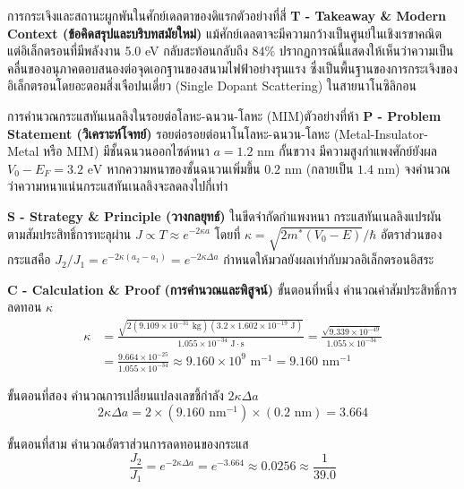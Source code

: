 \begin{psctbox}{การกระเจิงและสถานะผูกพันในศักย์เดลตาของดิแรก}{ตัวอย่างที่สี่}
\vspace{6pt}
\noindent\textbf{T - Takeaway \& Modern Context (ข้อคิดสรุปและบริบทสมัยใหม่)} แม้ศักย์เดลตาจะมีความกว้างเป็นศูนย์ในเชิงเรขาคณิต แต่อิเล็กตรอนที่มีพลังงาน 5.0 eV กลับสะท้อนกลับถึง $84\%$ ปรากฏการณ์นี้แสดงให้เห็นว่าความเป็นคลื่นของอนุภาคตอบสนองต่อจุดเอกฐานของสนามไฟฟ้าอย่างรุนแรง ซึ่งเป็นพื้นฐานของการกระเจิงของอิเล็กตรอนโดยอะตอมสิ่งเจือปนเดี่ยว (Single Dopant Scattering) ในสายนาโนซิลิกอน
\end{psctbox}

\begin{psctbox}{การคำนวณกระแสทันเนลลิงในรอยต่อโลหะ-ฉนวน-โลหะ (MIM)}{ตัวอย่างที่ห้า}
\noindent\textbf{P - Problem Statement (วิเคราะห์โจทย์)} รอยต่อรอยต่อนาโนโลหะ-ฉนวน-โลหะ (Metal-Insulator-Metal หรือ MIM) มีชั้นฉนวนออกไซด์หนา $a = 1.2\text{ nm}$ กั้นขวาง มีความสูงกำแพงศักย์ยังผล $V_0 - E_F = 3.2\text{ eV}$ หากความหนาของชั้นฉนวนเพิ่มขึ้น $0.2\text{ nm}$ (กลายเป็น $1.4\text{ nm}$) จงคำนวณว่าความหนาแน่นกระแสทันเนลลิงจะลดลงไปกี่เท่า

\vspace{6pt}
\noindent\textbf{S - Strategy \& Principle (วางกลยุทธ์)} ในขีดจำกัดกำแพงหนา กระแสทันเนลลิงแปรผันตามสัมประสิทธิ์การทะลุผ่าน $J \propto T \approx e^{-2\kappa a}$ โดยที่ $\kappa = \sqrt{2m^*(V_0 - E)}/\hbar$ อัตราส่วนของกระแสคือ $J_2/J_1 = e^{-2\kappa(a_2 - a_1)} = e^{-2\kappa \Delta a}$ กำหนดให้มวลยังผลเท่ากับมวลอิเล็กตรอนอิสระ

\vspace{6pt}
\noindent\textbf{C - Calculation \& Proof (การคำนวณและพิสูจน์)}
ขั้นตอนที่หนึ่ง คำนวณค่าสัมประสิทธิ์การลดทอน $\kappa$
\begin{align}
\kappa &= \frac{\sqrt{2(9.109 \times 10^{-31}\text{ kg})(3.2 \times 1.602 \times 10^{-19}\text{ J})}}{1.055 \times 10^{-34}\text{ J}\cdot\text{s}} = \frac{\sqrt{9.339 \times 10^{-49}}}{1.055 \times 10^{-34}} \\
&= \frac{9.664 \times 10^{-25}}{1.055 \times 10^{-34}} \approx 9.160 \times 10^9\text{ m}^{-1} = 9.160\text{ nm}^{-1}
\end{align}

ขั้นตอนที่สอง คำนวณการเปลี่ยนแปลงเลขชี้กำลัง $2\kappa \Delta a$
\begin{equation}
2\kappa \Delta a = 2 \times (9.160\text{ nm}^{-1}) \times (0.2\text{ nm}) = 3.664
\end{equation}

ขั้นตอนที่สาม คำนวณอัตราส่วนการลดทอนของกระแส
\begin{equation}
\frac{J_2}{J_1} = e^{-2\kappa \Delta a} = e^{-3.664} \approx 0.0256 \approx \frac{1}{39.0}
\end{equation}


\end{psctbox}
